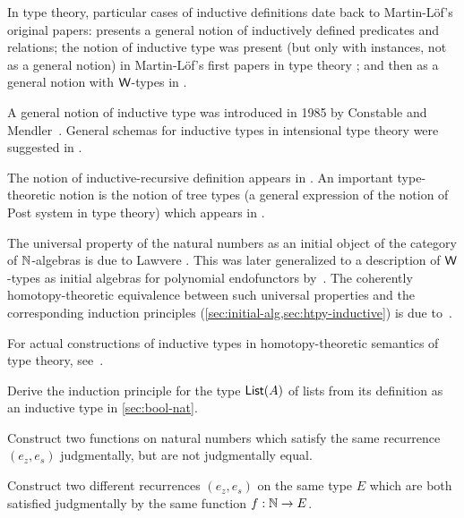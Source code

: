 In type theory, particular cases of inductive definitions date back to Martin-L\"of's original papers: \cite{martin-lof-hauptsatz} presents a general notion of inductively defined predicates and relations; the notion of inductive type was present (but only with instances, not as a general notion) in Martin-L\"of's first papers in type theory \cite{Martin-Lof-1973};
and then as a general notion with $\mathsf{W}$-types in \cite{Martin-Lof-1979}.%

A general notion of inductive type was introduced in 1985 by Constable and Mendler~\cite{DBLP:conf/lop/ConstableM85}.  General schemas for inductive types in intensional type theory were suggested in
\cite{PfenningPaulinMohring, CoquandPaulin, Dybjer:1991}.

The notion of inductive-recursive definition appears in \cite{Dybjer:2000}. An important  type-theoretic notion is the notion of tree types (a general expression of the notion of Post system in type theory) which appears in \cite{PeterssonSynek}.

The universal property of the natural numbers as an initial object of the category of $\mathbb{N}$-algebras is due to Lawvere \cite{lawvere:adjinfound}.
This was later generalized to a description of $\mathsf{W}$-types as initial algebras for polynomial endofunctors by~\cite{mp:wftrees}.
The coherently homotopy-theoretic equivalence between such universal properties and the corresponding induction principles (\cref{sec:initial-alg,sec:htpy-inductive}) is due to~\cite{ags:it-hott}.

For actual constructions of inductive types in homotopy-theoretic semantics of type theory, see~\cite{klv:ssetmodel,mvdb:wtypes,ls:hits}.

\sectionExercises

\begin{ex}\label{ex:ind-lst}
  Derive the induction principle for the type $\mathsf{List}(A)$ of lists from its definition as an inductive type in \cref{sec:bool-nat}.
\end{ex}

\begin{ex}\label{ex:same-recurrence-not-defeq}
  Construct two functions on natural numbers which satisfy the same recurrence $(e_z, e_s)$ judgmentally, but are not judgmentally equal.
\end{ex}

\begin{ex}\label{ex:one-function-two-recurrences}
  Construct two different recurrences $(e_z,e_s)$ on the same type $E$ which are both satisfied judgmentally by the same function $f:\mathbb{N}\to E$.
\end{ex}

